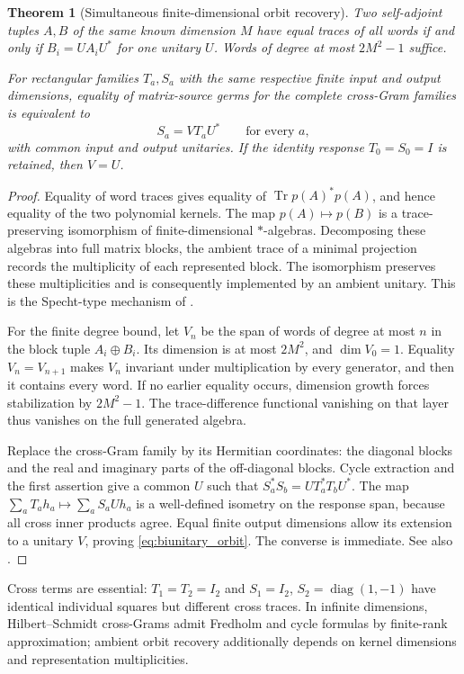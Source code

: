 \documentclass[11pt,a4paper]{amsart}
\numberwithin{equation}{section}
\newtheorem{theorem}{Theorem}[section]
\theoremstyle{definition}
\theoremstyle{remark}
\DeclareMathOperator{\Tr}{Tr}
\DeclareMathOperator{\diag}{diag}
\begin{document}
\begin{theorem}[Simultaneous finite-dimensional orbit recovery]\label{thm:finite_orbit}
Two self-adjoint tuples $A,B$ of the same known dimension $M$ have equal traces of all words if and only if $B_i=UA_iU^*$ for one unitary $U$. Words of degree at most $2M^2-1$ suffice.

For rectangular families $T_a,S_a$ with the same respective finite input and output dimensions, equality of matrix-source germs for the complete cross-Gram families is equivalent to
\begin{equation}\label{eq:biunitary_orbit}
 S_a=VT_aU^*\qquad\text{for every }a,
\end{equation}
with common input and output unitaries. If the identity response $T_0=S_0=I$ is retained, then $V=U$.
\end{theorem}
\begin{proof}
Equality of word traces gives equality of $\Tr p(A)^*p(A)$, and hence equality of the two polynomial kernels. The map $p(A)\mapsto p(B)$ is a trace-preserving isomorphism of finite-dimensional $*$-algebras. Decomposing these algebras into full matrix blocks, the ambient trace of a minimal projection records the multiplicity of each represented block. The isomorphism preserves these multiplicities and is consequently implemented by an ambient unitary. This is the Specht-type mechanism of \cite{FHS}.

For the finite degree bound, let $V_n$ be the span of words of degree at most $n$ in the block tuple $A_i\oplus B_i$. Its dimension is at most $2M^2$, and $\dim V_0=1$. Equality $V_n=V_{n+1}$ makes $V_n$ invariant under multiplication by every generator, and then it contains every word. If no earlier equality occurs, dimension growth forces stabilization by $2M^2-1$. The trace-difference functional vanishing on that layer thus vanishes on the full generated algebra.

Replace the cross-Gram family by its Hermitian coordinates: the diagonal blocks and the real and imaginary parts of the off-diagonal blocks. Cycle extraction and the first assertion give a common $U$ such that
$S_a^*S_b=UT_a^*T_bU^*$.
The map
$\sum_aT_ah_a\mapsto\sum_aS_aUh_a$
is a well-defined isometry on the response span, because all cross inner products agree. Equal finite output dimensions allow its extension to a unitary $V$, proving \eqref{eq:biunitary_orbit}. The converse is immediate. See also \cite{Jing,FHS}.
\end{proof}

Cross terms are essential: $T_1=T_2=I_2$ and $S_1=I_2$, $S_2=\diag(1,-1)$ have identical individual squares but different cross traces. In infinite dimensions, Hilbert--Schmidt cross-Grams admit Fredholm and cycle formulas by finite-rank approximation; ambient orbit recovery additionally depends on kernel dimensions and representation multiplicities.
\end{document}
